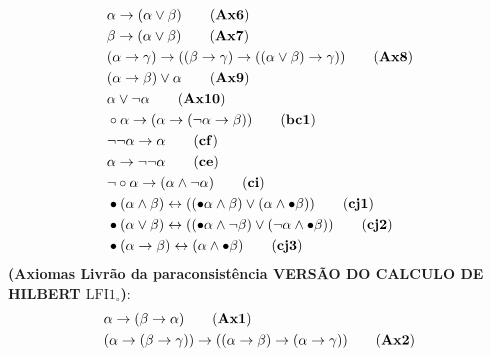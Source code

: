 \begin{definicao}[\lfium{}]
\begin{align*}
         & \alpha \rightarrow (\alpha \lor \beta)\tag{\textbf{Ax6}}                                                                                            \\
         & \beta \rightarrow (\alpha \lor \beta)\tag{\textbf{Ax7}}                                                                                             \\
         & (\alpha \rightarrow \gamma) \rightarrow ((\beta \rightarrow \gamma) \rightarrow ((\alpha \lor \beta) \rightarrow \gamma))\tag{\textbf{Ax8}}         \\
         & (\alpha \rightarrow \beta) \lor \alpha\tag{\textbf{Ax9}}                                                                                           \\
         & \alpha \lor \neg \alpha\tag{\textbf{Ax10}}                                                                                                          \\
         & \circ \alpha \rightarrow (\alpha \rightarrow (\neg \alpha \rightarrow \beta))\tag{\textbf{bc1}}                                                     \\
         & \neg \neg \alpha \rightarrow \alpha\tag{\textbf{cf}}
         \\
         & \alpha \rightarrow \neg \neg \alpha\tag{\textbf{ce}}
         \\
         & \neg \circ \alpha \rightarrow (\alpha \land \neg \alpha)\tag{\textbf{ci}}                                                                           \\
         & \bullet (\alpha \land \beta) \leftrightarrow ((\bullet \alpha \land \beta) \lor (\alpha \land \bullet \beta))\tag{\textbf{cj1}}                     \\
         & \bullet (\alpha \lor \beta) \leftrightarrow ((\bullet \alpha \land \neg \beta) \lor (\neg \alpha \land \bullet \beta))\tag{\textbf{cj2}}            \\
         & \bullet (\alpha \rightarrow \beta) \leftrightarrow (\alpha \land \bullet \beta)\tag{\textbf{cj3}}
    \end{align*}
    \noindent\textbf{(Axiomas Livrão da paraconsistência VERSÃO DO CALCULO DE HILBERT $\text{LFI1}_{\circ}$)}:
    \begin{align*}
        & \alpha \rightarrow (\beta \rightarrow \alpha)\tag{\textbf{Ax1}}                                                                                     \\
        & (\alpha \rightarrow (\beta \rightarrow \gamma)) \rightarrow ((\alpha \rightarrow \beta) \rightarrow (\alpha \rightarrow \gamma ))\tag{\textbf{Ax2}} \\

\end{align*}
\end{definicao}
